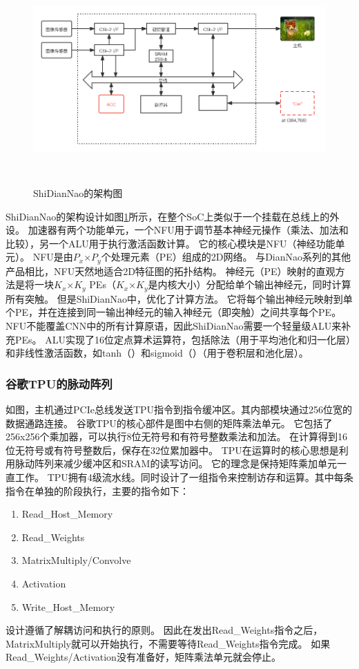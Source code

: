 \begin{figure}[htbp]
    \centering
    \includegraphics[width=15cm,height=8cm]{figures/ShiDianNao_arch.png}
    \caption{ShiDianNao的架构图}
    \label{fig:shidiannao_arch}
\end{figure}
ShiDianNao的架构设计如图\ref{fig:shidiannao_arch}所示，在整个SoC上类似于一个挂载在总线上的外设。
加速器有两个功能单元，一个NFU用于调节基本神经元操作（乘法、加法和比较），另一个ALU用于执行激活函数计算。
它的核心模块是NFU（神经功能单元）。
NFU是由$P_x$×$P_y$个处理元素（PE）组成的2D网络。
与DianNao系列的其他产品相比，NFU天然地适合2D特征图的拓扑结构。  
神经元（PE）映射的直观方法是将一块$K_x$×$K_y$ PEs（$K_x$×$K_y$是内核大小）分配给单个输出神经元，同时计算所有突触。
但是ShiDianNao中，优化了计算方法。
它将每个输出神经元映射到单个PE，并在连接到同一输出神经元的输入神经元（即突触）之间共享每个PE。  
NFU不能覆盖CNN中的所有计算原语，因此ShiDianNao需要一个轻量级ALU来补充PEs。
ALU实现了16位定点算术运算符，包括除法（用于平均池化和归一化层）和非线性激活函数，如tanh（）和sigmoid（）（用于卷积层和池化层）。

\subsubsection{谷歌TPU的脉动阵列}
如图，主机通过PCIe总线发送TPU指令到指令缓冲区。其内部模块通过256位宽的数据通路连接。
谷歌TPU的核心部件是图中右侧的矩阵乘法单元。
它包括了256x256个乘加器，可以执行8位无符号和有符号整数乘法和加法。
在计算得到16位无符号或有符号整数后，保存在32位累加器中。
TPU在运算时的核心思想是利用脉动阵列来减少缓冲区和SRAM的读写访问。
它的理念是保持矩阵乘加单元一直工作。
TPU拥有4级流水线。同时设计了一组指令来控制访存和运算。其中每条指令在单独的阶段执行，主要的指令如下：
\begin{enumerate}
    \item Read\_Host\_Memory
    \item Read\_Weights
    \item MatrixMultiply/Convolve
    \item Activation
    \item Write\_Host\_Memory
\end{enumerate}
设计遵循了解耦访问和执行的原则。
因此在发出Read\_Weights指令之后，MatrixMultiply就可以开始执行，不需要等待Read\_Weights指令完成。
如果Read\_Weights/Activation没有准备好，矩阵乘法单元就会停止。


